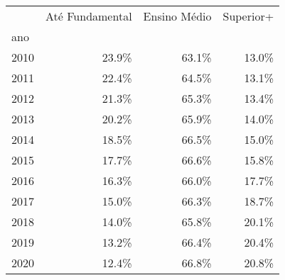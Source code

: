 \begin{tabular}{lrrr}
\toprule
{} &  Até Fundamental &  Ensino Médio &  Superior+ \\
ano  &                  &               &            \\
\midrule
2010 &            23.9\% &         63.1\% &      13.0\% \\
2011 &            22.4\% &         64.5\% &      13.1\% \\
2012 &            21.3\% &         65.3\% &      13.4\% \\
2013 &            20.2\% &         65.9\% &      14.0\% \\
2014 &            18.5\% &         66.5\% &      15.0\% \\
2015 &            17.7\% &         66.6\% &      15.8\% \\
2016 &            16.3\% &         66.0\% &      17.7\% \\
2017 &            15.0\% &         66.3\% &      18.7\% \\
2018 &            14.0\% &         65.8\% &      20.1\% \\
2019 &            13.2\% &         66.4\% &      20.4\% \\
2020 &            12.4\% &         66.8\% &      20.8\% \\
\bottomrule
\end{tabular}
